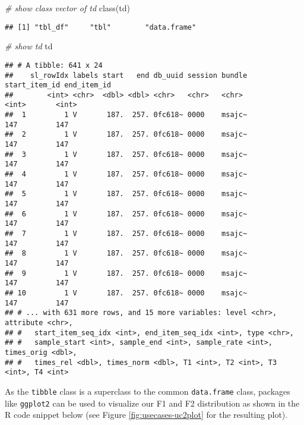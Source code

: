 \documentclass[
]{book}
\newenvironment{Shaded}{\begin{snugshade}}{\end{snugshade}}
\newcommand{\CommentTok}[1]{\textcolor[rgb]{0.56,0.35,0.01}{\textit{#1}}}
\newcommand{\FunctionTok}[1]{\textcolor[rgb]{0.00,0.00,0.00}{#1}}
\newcommand{\NormalTok}[1]{#1}
\begin{document}
\begin{Shaded}
\begin{Highlighting}[]
\CommentTok{\# show class vector of td}
\FunctionTok{class}\NormalTok{(td)}
\end{Highlighting}
\end{Shaded}

\begin{verbatim}
## [1] "tbl_df"     "tbl"        "data.frame"
\end{verbatim}

\begin{Shaded}
\begin{Highlighting}[]
\CommentTok{\# show td}
\NormalTok{td}
\end{Highlighting}
\end{Shaded}

\begin{verbatim}
## # A tibble: 641 x 24
##    sl_rowIdx labels start   end db_uuid session bundle start_item_id end_item_id
##        <int> <chr>  <dbl> <dbl> <chr>   <chr>   <chr>          <int>       <int>
##  1         1 V       187.  257. 0fc618~ 0000    msajc~           147         147
##  2         1 V       187.  257. 0fc618~ 0000    msajc~           147         147
##  3         1 V       187.  257. 0fc618~ 0000    msajc~           147         147
##  4         1 V       187.  257. 0fc618~ 0000    msajc~           147         147
##  5         1 V       187.  257. 0fc618~ 0000    msajc~           147         147
##  6         1 V       187.  257. 0fc618~ 0000    msajc~           147         147
##  7         1 V       187.  257. 0fc618~ 0000    msajc~           147         147
##  8         1 V       187.  257. 0fc618~ 0000    msajc~           147         147
##  9         1 V       187.  257. 0fc618~ 0000    msajc~           147         147
## 10         1 V       187.  257. 0fc618~ 0000    msajc~           147         147
## # ... with 631 more rows, and 15 more variables: level <chr>, attribute <chr>,
## #   start_item_seq_idx <int>, end_item_seq_idx <int>, type <chr>,
## #   sample_start <int>, sample_end <int>, sample_rate <int>, times_orig <dbl>,
## #   times_rel <dbl>, times_norm <dbl>, T1 <int>, T2 <int>, T3 <int>, T4 <int>
\end{verbatim}

As the \texttt{tibble} class is a superclass to the common \texttt{data.frame} class, packages like \texttt{ggplot2} can be used to visualize our F1 and F2 distribution as shown in the R code snippet below (see Figure \ref{fig:usecases-uc2plot} for the resulting plot).
\end{document}
